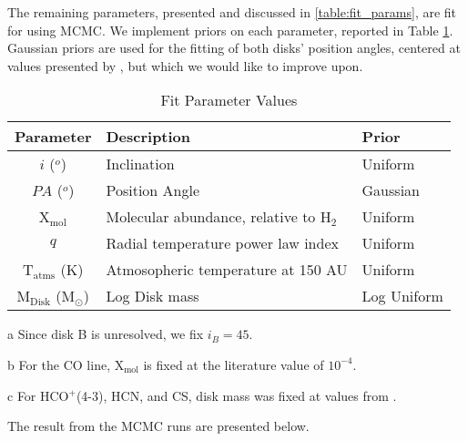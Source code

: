 The remaining parameters, presented and discussed in \ref{table:fit_params}, are fit for using MCMC. We implement priors on each parameter, reported in Table \ref{table:fit_priors}. Gaussian priors are used for the fitting of both disks' position angles, centered at values presented by \cite{Williams2014}, but which we would like to improve upon.

\begin{table}
  \begin{threeparttable}
    \centering
    \caption{Fit Parameter Values}
    \label{table:fit_priors}
    \renewcommand{\arraystretch}{1.2}
    \begin{tabular}{c  l l }
      \toprule \toprule
      Parameter             &  Description                                     & Prior   \\
      \midrule %
      $i$ ($^o$)            &  Inclination\tnote{a}                            & Uniform  \\
      $PA$ ($^o$)           &  Position Angle                                  & Gaussian \\
      X$_\text{mol}$        &  Molecular abundance, relative to H$_2$\tnote{b} & Uniform \\
      $q$                   &  Radial temperature power law index              & Uniform \\
      T$_\text{atms}$ (K)   & Atmosopheric temperature at 150 AU               & Uniform \\
      M$_\text{Disk}$ (M$_\odot$) &  Log Disk mass\tnote{c}                    & Log Uniform \\
      \bottomrule
    \end{tabular}

    \begin{tablenotes}\footnotesize
      \item[a] Since disk B is unresolved, we fix $i_B = 45$.
      \item[b] For the CO line, X$_\text{mol}$ is fixed at the literature value of $10^{-4}$.
      \item[c] For HCO$^+$(4-3), HCN, and CS, disk mass was fixed at values from \cite{Williams2014}.
    \end{tablenotes}
  \end{threeparttable}
\end{table}


The result from the MCMC runs are presented below.






